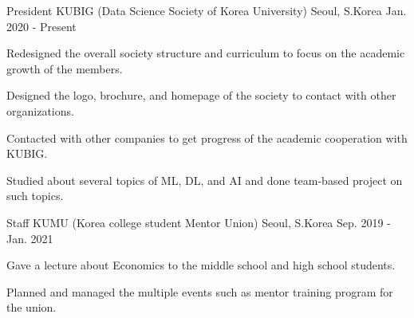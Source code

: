 

\begin{cventries}

  \cventry
    {President} %
    {KUBIG (Data Science Society of Korea University)} %
    {Seoul, S.Korea} %
    {Jan. 2020 - Present} %
    {
      \begin{cvitems} %
        \item {Redesigned the overall society structure and curriculum to focus on the academic growth of the members.}
        \item {Designed the logo, brochure, and homepage of the society to contact with other organizations.}
        \item {Contacted with other companies to get progress of the academic cooperation with KUBIG.}
        \item {Studied about several topics of ML, DL, and AI and done team-based project on such topics.}
      \end{cvitems}
    }

  \cventry
    {Staff} %
    {KUMU (Korea college student Mentor Union)} %
    {Seoul, S.Korea} %
    {Sep. 2019 - Jan. 2021} %
    {
      \begin{cvitems} %
        \item {Gave a lecture about Economics to the middle school and high school students.}
        \item {Planned and managed the multiple events such as mentor training program for the union.}
      \end{cvitems}
    }

\end{cventries}

